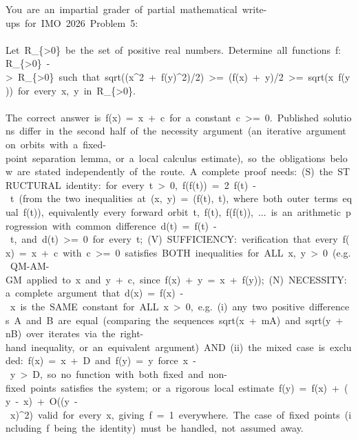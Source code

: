 \begin{flushleft}\ttfamily\scriptsize{}
{}You\ are\ an\ impartial\ grader\ of\ partial\ mathematical\ write-{}ups\ for\ IMO\ 2026\ Problem\ 5:\\
\mbox{}\\
{}\textquotedbl{}Let\ R\_\{\textgreater{}0\}\ be\ the\ set\ of\ positive\ real\ numbers.\ Determine\ all\ functions\ f:\ R\_\{\textgreater{}0\}\ -{}\textgreater{}\ R\_\{\textgreater{}0\}\ such\ that\ sqrt((x\^{}2\ +\ f(y)\^{}2)/2)\ \textgreater{}=\ (f(x)\ +\ y)/2\ \textgreater{}=\ sqrt(x\ f(y))\ for\ every\ x,\ y\ in\ R\_\{\textgreater{}0\}.\textquotedbl{}\\
\mbox{}\\
{}The\ correct\ answer\ is\ f(x)\ =\ x\ +\ c\ for\ a\ constant\ c\ \textgreater{}=\ 0.\ Published\ solutions\ differ\ in\ the\ second\ half\ of\ the\ necessity\ argument\ (an\ iterative\ argument\ on\ orbits\ with\ a\ fixed-{}point\ separation\ lemma,\ or\ a\ local\ calculus\ estimate),\ so\ the\ obligations\ below\ are\ stated\ independently\ of\ the\ route.\ A\ complete\ proof\ needs:\ (S)\ the\ STRUCTURAL\ identity:\ for\ every\ t\ \textgreater{}\ 0,\ f(f(t))\ =\ 2\ f(t)\ -{}\ t\ (from\ the\ two\ inequalities\ at\ (x,\ y)\ =\ (f(t),\ t),\ where\ both\ outer\ terms\ equal\ f(t)),\ equivalently\ every\ forward\ orbit\ t,\ f(t),\ f(f(t)),\ ...\ is\ an\ arithmetic\ progression\ with\ common\ difference\ d(t)\ =\ f(t)\ -{}\ t,\ and\ d(t)\ \textgreater{}=\ 0\ for\ every\ t;\ (V)\ SUFFICIENCY:\ verification\ that\ every\ f(x)\ =\ x\ +\ c\ with\ c\ \textgreater{}=\ 0\ satisfies\ BOTH\ inequalities\ for\ ALL\ x,\ y\ \textgreater{}\ 0\ (e.g.\ QM-{}AM-{}GM\ applied\ to\ x\ and\ y\ +\ c,\ since\ f(x)\ +\ y\ =\ x\ +\ f(y));\ (N)\ NECESSITY:\ a\ complete\ argument\ that\ d(x)\ =\ f(x)\ -{}\ x\ is\ the\ SAME\ constant\ for\ ALL\ x\ \textgreater{}\ 0,\ e.g.\ (i)\ any\ two\ positive\ differences\ A\ and\ B\ are\ equal\ (comparing\ the\ sequences\ sqrt(x\ +\ mA)\ and\ sqrt(y\ +\ nB)\ over\ iterates\ via\ the\ right-{}hand\ inequality,\ or\ an\ equivalent\ argument)\ AND\ (ii)\ the\ mixed\ case\ is\ excluded:\ f(x)\ =\ x\ +\ D\ and\ f(y)\ =\ y\ force\ \textbar{}x\ -{}\ y\textbar{}\ \textgreater{}\ D,\ so\ no\ function\ with\ both\ fixed\ and\ non-{}fixed\ points\ satisfies\ the\ system;\ or\ a\ rigorous\ local\ estimate\ f(y)\ =\ f(x)\ +\ (y\ -{}\ x)\ +\ O((y\ -{}\ x)\^{}2)\ valid\ for\ every\ x,\ giving\ f\textquotesingle{}\ =\ 1\ everywhere.\ The\ case\ of\ fixed\ points\ (including\ f\ being\ the\ identity)\ must\ be\ handled,\ not\ assumed\ away.\\

\end{flushleft}
